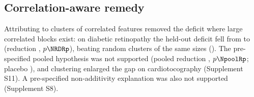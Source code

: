 \subsection{Correlation-aware remedy}
Attributing to clusters of correlated features removed the deficit where large correlated blocks exist: on diabetic retinopathy the held-out deficit fell from \NdfeatDR{} to \NdgrpDR{} (reduction \NRDR, $p\NRDRp$), beating random clusters of the same sizes (\NPLDR). The pre-specified pooled hypothesis was not supported (pooled reduction \NpoolR, $p\NpoolRp$; placebo \NpoolPL), and clustering enlarged the gap on cardiotocography (Supplement S11). A pre-specified non-additivity explanation was also not supported (Supplement S8).
